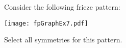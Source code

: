 \documentclass{ximera}
\author{Bart Snapp}
\begin{document}
\begin{exercise}
  Consider the following frieze pattern:
  \begin{image}
  \texttt{[image: fpGraphEx7.pdf]}
  \end{image}
  Select all symmetries for this pattern.
  \begin{selectAll}
  \end{selectAll}
\end{exercise}
\end{document}

